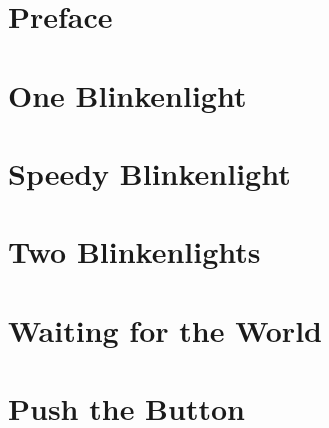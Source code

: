 \documentclass[a5paper,oneside]{scrbook}
\begin{document}
	


\tableofcontents

\chapter*{Preface\label{preface}}


\chapter{One Blinkenlight\label{ch1}}


\chapter{Speedy Blinkenlight\label{ch2}}


\chapter{Two Blinkenlights\label{ch3}}


\chapter*{Waiting for the World\label{medio1}}


\chapter{Push the Button\label{ch4}}


%

%
\end{document}
